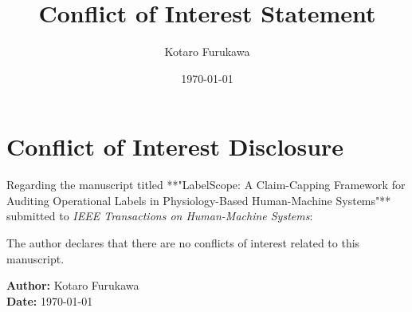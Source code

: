 \documentclass[11pt]{article}
\title{Conflict of Interest Statement}
\author{Kotaro Furukawa}
\date{\today}
\begin{document}
\maketitle

\section*{Conflict of Interest Disclosure}

Regarding the manuscript titled **"LabelScope: A Claim-Capping Framework for Auditing Operational Labels in Physiology-Based Human-Machine Systems"** submitted to \emph{IEEE Transactions on Human-Machine Systems}:

The author declares that there are no conflicts of interest related to this manuscript.

\vspace{1cm}

\noindent \textbf{Author:} Kotaro Furukawa \\
\noindent \textbf{Date:} \today
\end{document}
